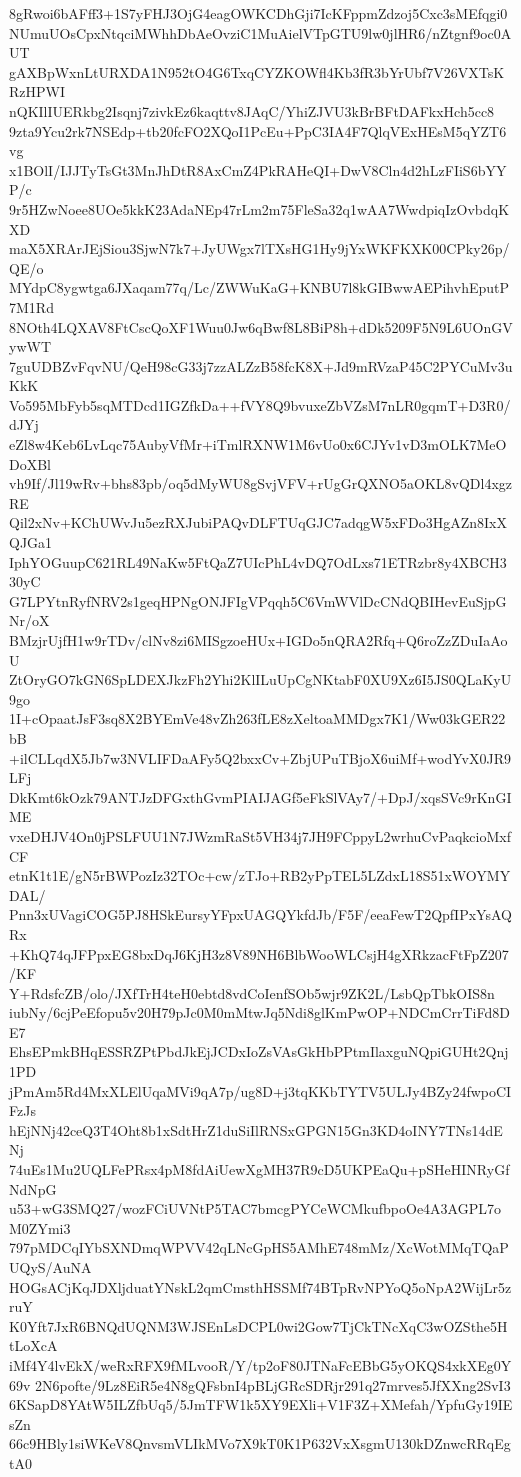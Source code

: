 8gRwoi6bAFff3+1S7yFHJ3OjG4eagOWKCDhGji7IcKFppmZdzoj5Cxc3sMEfqgi0
NUmuUOsCpxNtqciMWhhDbAeOvziC1MuAielVTpGTU9lw0jlHR6/nZtgnf9oc0AUT
gAXBpWxnLtURXDA1N952tO4G6TxqCYZKOWfl4Kb3fR3bYrUbf7V26VXTsKRzHPWI
nQKIlIUERkbg2Isqnj7zivkEz6kaqttv8JAqC/YhiZJVU3kBrBFtDAFkxHch5cc8
9zta9Ycu2rk7NSEdp+tb20fcFO2XQoI1PcEu+PpC3IA4F7QlqVExHEsM5qYZT6vg
x1BOlI/IJJTyTsGt3MnJhDtR8AxCmZ4PkRAHeQI+DwV8Cln4d2hLzFIiS6bYYP/c
9r5HZwNoee8UOe5kkK23AdaNEp47rLm2m75FleSa32q1wAA7WwdpiqIzOvbdqKXD
maX5XRArJEjSiou3SjwN7k7+JyUWgx7lTXsHG1Hy9jYxWKFKXK00CPky26p/QE/o
MYdpC8ygwtga6JXaqam77q/Lc/ZWWuKaG+KNBU7l8kGIBwwAEPihvhEputP7M1Rd
8NOth4LQXAV8FtCscQoXF1Wuu0Jw6qBwf8L8BiP8h+dDk5209F5N9L6UOnGVywWT
7guUDBZvFqvNU/QeH98cG33j7zzALZzB58fcK8X+Jd9mRVzaP45C2PYCuMv3uKkK
Vo595MbFyb5sqMTDcd1IGZfkDa++fVY8Q9bvuxeZbVZsM7nLR0gqmT+D3R0/dJYj
eZl8w4Keb6LvLqc75AubyVfMr+iTmlRXNW1M6vUo0x6CJYv1vD3mOLK7MeODoXBl
vh9If/Jl19wRv+bhs83pb/oq5dMyWU8gSvjVFV+rUgGrQXNO5aOKL8vQDl4xgzRE
Qil2xNv+KChUWvJu5ezRXJubiPAQvDLFTUqGJC7adqgW5xFDo3HgAZn8IxXQJGa1
IphYOGuupC621RL49NaKw5FtQaZ7UIcPhL4vDQ7OdLxs71ETRzbr8y4XBCH330yC
G7LPYtnRyfNRV2s1geqHPNgONJFIgVPqqh5C6VmWVlDcCNdQBIHevEuSjpGNr/oX
BMzjrUjfH1w9rTDv/clNv8zi6MISgzoeHUx+IGDo5nQRA2Rfq+Q6roZzZDuIaAoU
ZtOryGO7kGN6SpLDEXJkzFh2Yhi2KlILuUpCgNKtabF0XU9Xz6I5JS0QLaKyU9go
1I+cOpaatJsF3sq8X2BYEmVe48vZh263fLE8zXeltoaMMDgx7K1/Ww03kGER22bB
+ilCLLqdX5Jb7w3NVLIFDaAFy5Q2bxxCv+ZbjUPuTBjoX6uiMf+wodYvX0JR9LFj
DkKmt6kOzk79ANTJzDFGxthGvmPIAIJAGf5eFkSlVAy7/+DpJ/xqsSVc9rKnGIME
vxeDHJV4On0jPSLFUU1N7JWzmRaSt5VH34j7JH9FCppyL2wrhuCvPaqkcioMxfCF
etnK1t1E/gN5rBWPozIz32TOc+cw/zTJo+RB2yPpTEL5LZdxL18S51xWOYMYDAL/
Pnn3xUVagiCOG5PJ8HSkEursyYFpxUAGQYkfdJb/F5F/eeaFewT2QpfIPxYsAQRx
+KhQ74qJFPpxEG8bxDqJ6KjH3z8V89NH6BlbWooWLCsjH4gXRkzacFtFpZ207/KF
Y+RdsfcZB/olo/JXfTrH4teH0ebtd8vdCoIenfSOb5wjr9ZK2L/LsbQpTbkOIS8n
iubNy/6cjPeEfopu5v20H79pJc0M0mMtwJq5Ndi8glKmPwOP+NDCmCrrTiFd8DE7
EhsEPmkBHqESSRZPtPbdJkEjJCDxIoZsVAsGkHbPPtmIlaxguNQpiGUHt2Qnj1PD
jPmAm5Rd4MxXLElUqaMVi9qA7p/ug8D+j3tqKKbTYTV5ULJy4BZy24fwpoCIFzJs
hEjNNj42ceQ3T4Oht8b1xSdtHrZ1duSiIlRNSxGPGN15Gn3KD4oINY7TNs14dENj
74uEs1Mu2UQLFePRsx4pM8fdAiUewXgMH37R9cD5UKPEaQu+pSHeHINRyGfNdNpG
u53+wG3SMQ27/wozFCiUVNtP5TAC7bmcgPYCeWCMkufbpoOe4A3AGPL7oM0ZYmi3
797pMDCqIYbSXNDmqWPVV42qLNcGpHS5AMhE748mMz/XcWotMMqTQaPUQyS/AuNA
HOGsACjKqJDXljduatYNskL2qmCmsthHSSMf74BTpRvNPYoQ5oNpA2WijLr5zruY
K0Yft7JxR6BNQdUQNM3WJSEnLsDCPL0wi2Gow7TjCkTNcXqC3wOZSthe5HtLoXcA
iMf4Y4lvEkX/weRxRFX9fMLvooR/Y/tp2oF80JTNaFcEBbG5yOKQS4xkXEg0Y69v
2N6pofte/9Lz8EiR5e4N8gQFsbnI4pBLjGRcSDRjr291q27mrves5JfXXng2SvI3
6KSapD8YAtW5ILZfbUq5/5JmTFW1k5XY9EXli+V1F3Z+XMefah/YpfuGy19IEsZn
66c9HBly1siWKeV8QnvsmVLIkMVo7X9kT0K1P632VxXsgmU130kDZnwcRRqEgtA0
